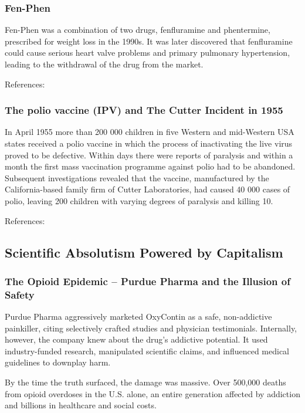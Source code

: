 \documentclass{article}
\begin{document}
\subsubsection{Fen-Phen}
Fen-Phen was a combination of two drugs, fenfluramine and phentermine, prescribed for weight loss in the 1990s. It was later discovered that fenfluramine could cause serious heart valve problems and primary
pulmonary hypertension, leading to the withdrawal of the drug from the market.

References: \cite{Wolff1997}

\subsubsection{The polio vaccine (IPV) and The Cutter Incident in 1955}

In April 1955 more than 200 000 children in five Western and mid-Western USA states received a polio vaccine in which the process of inactivating the live virus proved to be defective. Within days there were reports of paralysis and within a month the first mass vaccination programme against polio had to be abandoned. Subsequent investigations revealed that the vaccine, manufactured by the California-based family firm of Cutter Laboratories, had caused 40 000 cases of polio, leaving 200 children with varying degrees of paralysis and killing 10.

References: \cite{Fitzpatrick2006}

\subsection{Scientific Absolutism Powered by Capitalism}

\subsubsection{The Opioid Epidemic – Purdue Pharma and the Illusion of Safety}

Purdue Pharma aggressively marketed OxyContin as a safe, non-addictive painkiller, citing selectively crafted studies and physician testimonials. Internally, however, the company knew about the drug's addictive potential. It used industry-funded research, manipulated scientific claims, and influenced medical guidelines to downplay harm.

By the time the truth surfaced, the damage was massive. Over 500,000 deaths from opioid overdoses in the U.S. alone, an entire generation affected by addiction and billions in healthcare and social costs.
\end{document}
